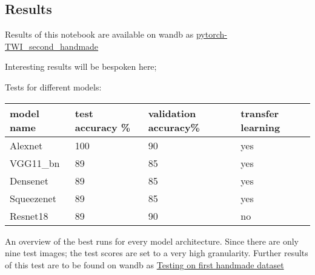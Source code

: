 \documentclass{scrartcl}
\begin{document}
\subsection{Results}

Results of this notebook are available on wandb as \href{https://wandb.ai/dplars/pytorch-TWI_second_handmade?workspace=user-dplars}{pytorch-TWI\_second\_handmade}



Interesting results will be bespoken here;

Tests for different models: 

\begin{tabular}{ |l|l|l|l| }
\hline
 model name & test accuracy \% & validation accuracy\% & transfer learning \tabularnewline
\hline
\hline
 Alexnet & 100 & 90 & yes \tabularnewline
\hline
 VGG11\_bn & 89 & 85 & yes \tabularnewline
\hline
 Densenet & 89 & 85 & yes \tabularnewline
\hline
 Squeezenet & 89 & 85 & yes \tabularnewline
\hline
 Resnet18 & 89 & 90 & no \tabularnewline
\hline
\end{tabular}
										

An overview of the best runs for every model architecture. Since there are only nine test images; the test scores are set to a very high granularity. Further results of this test are to be found on wandb as \href{https://wandb.ai/dplars/pytorch-TWI_second_handmade/reports/Testing-on-first-handmade-dataset--VmlldzozNTE5NzM}{Testing on first handmade dataset}
\end{document}

